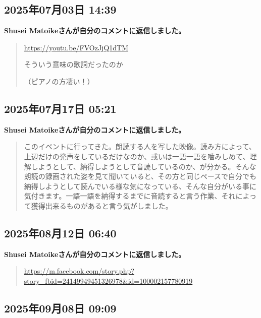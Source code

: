 \subsection*{2025年07月03日 14:39}

\textbf{Shusei Matoikeさんが自分のコメントに返信しました。}

\begin{quote}
\url{https://youtu.be/FVOzJjQ1dTM}

そういう意味の歌詞だったのか

（ピアノの方凄い！）
\end{quote}

\subsection*{2025年07月17日 05:21}

\textbf{Shusei Matoikeさんが自分のコメントに返信しました。}

\begin{quote}
このイベントに行ってきた。朗読する人を写した映像。読み方によって、上辺だけの発声をしているだけなのか、或いは一語一語を噛みしめて、理解しようとして、納得しようとして音読しているのか、が分かる。そんな朗読の録画された姿を見て聞いていると、その方と同じペースで自分でも納得しようとして読んでいる様な気になっている、そんな自分がいる事に気付きます。一語一語を納得するまでに音読すると言う作業、それによって獲得出来るものがあると言う気がしました。
\end{quote}

\subsection*{2025年08月12日 06:40}

\textbf{Shusei Matoikeさんが自分のコメントに返信しました。}

\begin{quote}
\url{https://m.facebook.com/story.php?story_fbid=24149949451326978&id=100002157780919}
\end{quote}

\subsection*{2025年09月08日 09:09}

